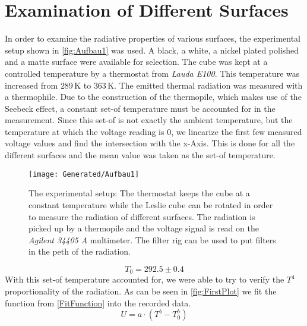 \documentclass[a4paper,10pt,twocolumn]{article}
\begin{document}
    
    
    
    \section{Examination of Different Surfaces}\label{sec:ExaminationOfDifferentSurfaces}
    In order to examine the radiative properties of various surfaces, the experimental setup shown in \autoref{fig:Aufbau1} was used.
    A black, a white, a nickel plated polished and a matte surface were available for selection. 
    The cube was kept at a controlled temperature by a thermostat from \textit{Lauda E100}.
    This temperature was increased from $ 289\,$K to $363\,$K.
    The emitted thermal radiation was measured with a thermophile.
    Due to the construction of the thermopile, which makes use of the Seebeck effect, a constant set-of temperature must be accounted for in the measurement.
    Since this set-of is not exactly the ambient temperature, but the temperature at which the voltage reading is $0$, we linearize the first few measured voltage values 
    and find the intersection with the x-Axis.
    This is done for all the different surfaces and the mean value was taken as the set-of temperature.
    \begin{figure}
        \begin{center}
            \texttt{[image: Generated/Aufbau1]}
            \caption{The experimental setup: The thermostat keeps the cube at a constant temperature while the Leslie 
            cube can be rotated in order to measure the radiation of different surfaces.
            The radiation is picked up by a thermopile and the voltage signal is read on the \textit{Agilent 34405 A} multimeter.
            The filter rig can be used to put filters in the peth of the radiation.}
            \label{fig:Aufbau1}
        \end{center}
    \end{figure}
    \begin{equation}\label{SetofTemp}
        T_0 = 292.5 \pm 0.4
    \end{equation}
    With this set-of temperature accounted for, we were able to try to verify the $T^4$ proportionality of the radiation.
    As can be seen in \autoref{fig:FirstPlot} we fit the function from \autoref{FitFunction} into the recorded data.
    \begin{equation}\label{FitFunction}
        U = a\cdot (T^b - T_0^b)
    \end{equation}
    
\end{document}
